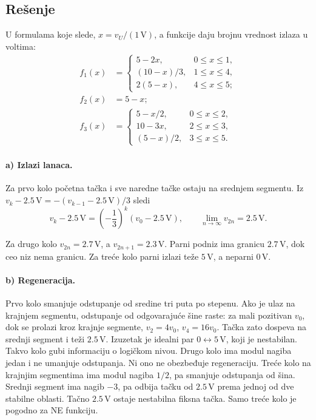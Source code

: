 \documentclass[a4paper,11pt]{article}
\numberwithin{equation}{section}
\begin{document}
\subsection*{Rešenje}
U formulama koje slede, $x=v_U/(1\,\mathrm V)$, a funkcije daju brojnu vrednost izlaza u voltima:
\begin{equation}\label{eq:3.1}
\begin{aligned} f_1(x)&=\begin{cases}5-2x,&0\le x\le1,\\(10-x)/3,&1\le x\le4,\\2(5-x),&4\le x\le5;\end{cases}\\ f_2(x)&=5-x;\\ f_3(x)&=\begin{cases}5-x/2,&0\le x\le2,\\10-3x,&2\le x\le3,\\(5-x)/2,&3\le x\le5.\end{cases}\end{aligned}
\end{equation}

\paragraph{a) Izlazi lanaca.}
Za prvo kolo početna tačka i sve naredne tačke ostaju na srednjem segmentu. Iz $v_k-2.5\,\mathrm V=-(v_{k-1}-2.5\,\mathrm V)/3$ sledi
\begin{equation}\label{eq:3.2}
v_k-2.5\,\mathrm V=\left(-\frac13\right)^k(v_0-2.5\,\mathrm V),\qquad \lim_{n\to\infty}v_{2n}=2.5\,\mathrm V.
\end{equation}

Za drugo kolo $v_{2n}=2.7\,\mathrm V$, a $v_{2n+1}=2.3\,\mathrm V$. Parni podniz ima granicu $2.7\,\mathrm V$, dok ceo niz nema granicu. Za treće kolo parni izlazi teže $5\,\mathrm V$, a neparni $0\,\mathrm V$.
\paragraph{b) Regeneracija.}
Prvo kolo smanjuje odstupanje od sredine tri puta po stepenu. Ako je ulaz na krajnjem segmentu, odstupanje od odgovarajuće šine raste: za mali pozitivan $v_0$, dok se prolazi kroz krajnje segmente, $v_2=4v_0$, $v_4=16v_0$. Tačka zato dospeva na srednji segment i teži $2.5\,\mathrm V$. Izuzetak je idealni par $0\leftrightarrow5\,\mathrm V$, koji je nestabilan. Takvo kolo gubi informaciju o logičkom nivou.
Drugo kolo ima modul nagiba jedan i ne umanjuje odstupanja. Ni ono ne obezbeđuje regeneraciju.
Treće kolo na krajnjim segmentima ima modul nagiba $1/2$, pa smanjuje odstupanja od šina. Srednji segment ima nagib $-3$, pa odbija tačku od $2.5\,\mathrm V$ prema jednoj od dve stabilne oblasti. Tačno $2.5\,\mathrm V$ ostaje nestabilna fiksna tačka. Samo treće kolo je pogodno za NE funkciju.
\end{document}
